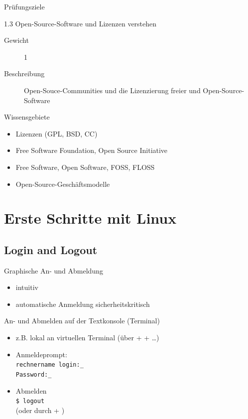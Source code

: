 \documentclass[aspectratio=43]{beamer}
\begin{document}
\begin{frame}{Prüfungsziele}
  \begin{alertblock}{1.3 Open-Source-Software und Lizenzen verstehen}
    \begin{description}
      \item[Gewicht]  1
      \item[Beschreibung] Open-Souce-Communities und die Lizenzierung freier und Open-Source-Software
    \end{description}
       Wissensgebiete\\ 
        \begin{itemize}
          \item Lizenzen (GPL, BSD, CC)
          \item Free Software Foundation, Open Source Initiative
          \item Free Software, Open Software, FOSS, FLOSS
          \item Open-Source-Geschäftsmodelle
        \end{itemize}
  \end{alertblock}
\end{frame}

\section{Erste Schritte mit Linux}
\subsection{Login and Logout}
\begin{frame}
  \begin{block}{Graphische An- und Abmeldung}
    \begin{itemize}
      \item intuitiv
      \item automatische Anmeldung sicherheitskritisch
    \end{itemize}
  \end{block}
  \begin{block}{An- und Abmelden auf der Textkonsole (Terminal)}
    \begin{itemize}
      \item z.B. lokal an virtuellen Terminal (über + +  \dots {})
      \item Anmeldeprompt:\\
        \texttt{rechnername login:\_ }\\
        \texttt{Password:\_}\\
      \item Abmelden\\
        \texttt{\$ logout}\\
        (oder durch + )
    \end{itemize}
  \end{block}
\end{frame}
\end{document}
